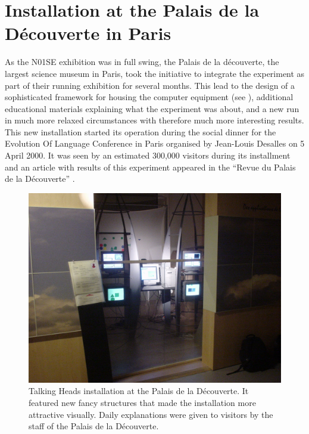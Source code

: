 \section{Installation at the Palais de la D\'{e}couverte in Paris}

As the N01SE exhibition was in full swing, the Palais de la d\'{e}couverte, the largest science museum in Paris, 
took the initiative to integrate the experiment as part of their running exhibition for several months. This lead 
to the design of a sophisticated framework for housing the computer equipment (see ), 
additional educational materials explaining
what the experiment was about, and a new run in much more relaxed circumstances with therefore much more 
interesting results. This new installation started its operation during the social 
dinner for the Evolution Of Language Conference in Paris organised by Jean-Louis Desalles
on 5 April 2000. It was seen by an estimated 300,000 visitors
during its installment and an article with results of this experiment
appeared in the ``Revue du Palais de la D\'{e}couverte'' \citep{Steels:2000kaplan}. 

\begin{figure}[htbp]
  \centerline{\includegraphics[width=\textwidth]{chap9/figs/th4.jpg}}
\caption{\label{fig:palais}Talking Heads installation at the Palais de la D\'{e}couverte. It featured new fancy structures that 
made the installation more attractive visually. Daily explanations were given to visitors 
by the staff of the Palais de la D\'{e}couverte.} 
\end{figure}

